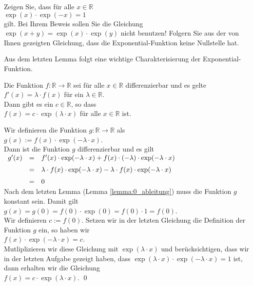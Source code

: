 \exercise
Zeigen Sie, dass f\"ur alle $x\in \mathbb{R}$
\\[0.2cm]
\hspace*{1.3cm}
$\exp(x) \cdot \exp(-x) = 1$ 
\\[0.2cm]
gilt.  Bei Ihrem Beweis sollen Sie die Gleichung $\exp(x+y) = \exp(x) \cdot \exp(y)$ nicht benutzen!
Folgern Sie aus der von Ihnen gezeigten Gleichung, dass die Exponential-Funktion keine Nullstelle hat. \eox
\vspace*{0.3cm}

\noindent
Aus dem letzten Lemma folgt eine wichtige Charakterisierung der Exponential-Funktion.
\begin{Lemma}
Die Funktion $f:\mathbb{R} \rightarrow \mathbb{R}$ sei f\"ur alle $x \in \mathbb{R}$ differenzierbar und es
gelte
\\[0.2cm]
\hspace*{1.3cm}
$f'(x) = \lambda \cdot f(x)$ \quad f\"ur ein $\lambda \in \mathbb{R}$.
\\[0.2cm]
Dann gibt es ein $c \in \mathbb{R}$, so dass
\\[0.2cm]
\hspace*{1.3cm}
$f(x) = c \cdot \exp(\lambda \cdot x)$ \quad f\"ur alle $x \in \mathbb{R}$ ist.
\end{Lemma}

\proof
Wir definieren die Funktion $g: \mathbb{R} \rightarrow \mathbb{R}$ als
\\[0.2cm]
\hspace*{1.3cm}
$g(x) := f(x) \cdot \exp(-\lambda \cdot x)$.
\\[0.2cm]
Dann ist die Funktion $g$ differenzierbar und es gilt
\\[0.2cm]
\hspace*{1.3cm}
$
\begin{array}[t]{lcll}
g'(x) & = & f'(x) \cdot \exp(-\lambda \cdot x) + f(x) \cdot (-\lambda) \cdot \exp(-\lambda \cdot x) 
          \\[0.2cm]
      & = & \lambda \cdot f(x) \cdot \exp(-\lambda \cdot x) - \lambda \cdot f(x) \cdot \exp(-\lambda \cdot x) 
          \\[0.2cm]
      & = & 0
\end{array}
$
\\[0.2cm]
Nach dem letzten Lemma (Lemma \ref{lemma:0_ableitung}) muss die Funktion $g$ konstant sein.  Damit gilt
\\[0.2cm]
\hspace*{1.3cm}
$g(x) = g(0) = f(0) \cdot \exp(0) = f(0) \cdot 1 = f(0)$.
\\[0.2cm]
Wir definieren $c:=f(0)$.  Setzen wir in der letzten Gleichung die Definition der Funktion $g$ ein, so
haben wir
\\[0.2cm]
\hspace*{1.3cm}
$f(x) \cdot \exp(-\lambda \cdot x) = c$.
\\[0.2cm]
Mutliplizieren wir diese Gleichung mit $\exp(\lambda \cdot x)$ und ber\"ucksichtigen, dass wir in der
letzten Aufgabe gezeigt haben, dass $\exp(\lambda \cdot x) \cdot \exp(-\lambda \cdot x) = 1$ ist,
dann erhalten wir die Gleichung
\\[0.2cm]
\hspace*{1.3cm}
$f(x) = c \cdot \exp(\lambda \cdot x)$.  \qed

